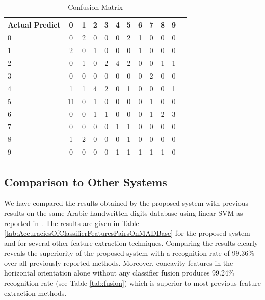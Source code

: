\documentclass[conference]{IEEEtran}
\begin{document}
 \begin{table}[h]
 \centering
\caption[First Stage result table]{ Confusion Matrix }
 \begin{tabular}{|p{0.3in}|c|c|c|c|c|c|c|c|c|c|c|}
  \hline
 Actual Predict & 0 &1&2&3&4&5&6&7&8&9 \\   \hline
0 & 0 & 2 & 0 & 0 & 0 & 2 & 1 & 0 & 0 & 0 \\ \hline
1& 2 & 0 & 1 & 0 & 0 & 0 & 1 & 0 & 0 & 0 \\ \hline
2& 0 & 1 & 0 & 2 & 4 & 2 & 0 & 0 & 1 & 1 \\ \hline
3& 0 & 0 & 0 & 0 & 0 & 0 & 0 & 2 & 0 & 0 \\ \hline
4& 1 & 1 & 4 & 2 & 0 & 1 & 0 & 0 & 0 & 1 \\ \hline
5& 11 & 0 & 1 & 0 & 0 & 0 & 0 & 1 & 0 & 0 \\ \hline
6 & 0 & 0 & 1 & 1 & 0 & 0 & 0 & 1 & 2 & 3 \\ \hline
7 & 0 & 0 & 0 & 0 & 1 & 1 & 0 & 0 & 0 & 0 \\ \hline
 8& 1 & 2 & 0 & 0 & 0 & 1 & 0 & 0 & 0 & 0 \\ \hline
 9& 0 & 0 & 0 & 0 & 1 & 1 & 1 & 1 & 1 & 0 \\ \hline
\end{tabular}
\label{tab:confusion}
\end{table}




\subsection{Comparison to Other Systems}
We have compared the results obtained by the proposed system with previous results on the same Arabic handwritten digits database using linear SVM as reported in \cite{IjdarSherifPaper,Abdelazeem2009}. The results are given in Table \ref{tab:AccuraciesOfClassifierFeaturesPairsOnMADBase} for the proposed system and for several other feature extraction techniques. Comparing the results clearly reveals the superiority of the proposed system with a recognition rate of 99.36\% over all previously reported methods. Moreover,  concavity features in the horizontal orientation alone without any classifier fusion produces 99.24\% recognition rate (see Table \ref{tab:fusion}) which is superior to most previous feature extraction methods.
\end{document}
